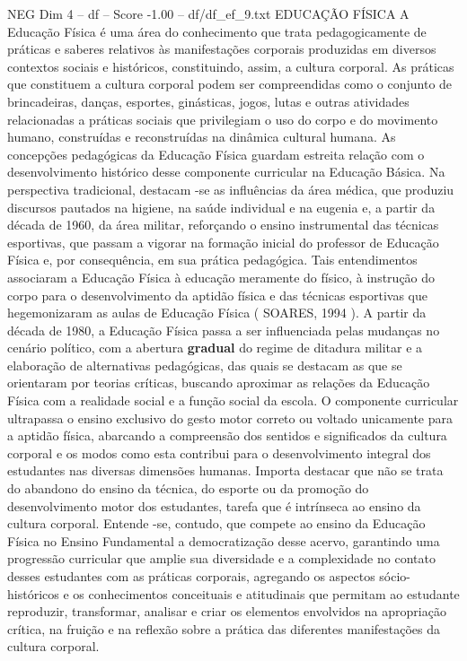 \begin{textsample}{NEG Dim 4 – df – Score -1.00 – df/df\_ef\_9.txt}  \label{ex:f4_neg_067}
EDUCAÇÃO FÍSICA A Educação Física é uma área do conhecimento que trata pedagogicamente de práticas e saberes relativos às manifestações corporais produzidas em diversos contextos sociais e históricos, constituindo, assim, a cultura corporal.
As práticas que constituem a cultura corporal podem ser compreendidas como o conjunto de brincadeiras, danças, esportes, ginásticas, jogos, lutas e outras atividades relacionadas a práticas sociais que privilegiam o uso do corpo e do movimento humano, construídas e reconstruídas na dinâmica cultural humana.
As concepções pedagógicas da Educação Física guardam estreita relação com o desenvolvimento histórico desse componente curricular na Educação Básica.
Na perspectiva tradicional, destacam -se as influências da área médica, que produziu discursos pautados na higiene, na saúde individual e na eugenia e, a partir da década de 1960, da área militar, reforçando o ensino instrumental das técnicas esportivas, que passam a vigorar na formação inicial do professor de Educação Física e, por consequência, em sua prática pedagógica.
Tais entendimentos associaram a Educação Física à educação meramente do físico, à instrução do corpo para o desenvolvimento da aptidão física e das técnicas esportivas que hegemonizaram as aulas de Educação Física ( SOARES, 1994 ).
A partir da década de 1980, a Educação Física passa a ser influenciada pelas mudanças no cenário político, com a abertura \textbf{gradual} do regime de ditadura militar e a elaboração de alternativas pedagógicas, das quais se destacam as que se orientaram por teorias críticas, buscando aproximar as relações da Educação Física com a realidade social e a função social da escola.
O componente curricular ultrapassa o ensino exclusivo do gesto motor correto ou voltado unicamente para a aptidão física, abarcando a compreensão dos sentidos e significados da cultura corporal e os modos como esta contribui para o desenvolvimento integral dos estudantes nas diversas dimensões humanas.
Importa destacar que não se trata do abandono do ensino da técnica, do esporte ou da promoção do desenvolvimento motor dos estudantes, tarefa que é intrínseca ao ensino da cultura corporal.
Entende -se, contudo, que compete ao ensino da Educação Física no Ensino Fundamental a democratização desse acervo, garantindo uma progressão curricular que amplie sua diversidade e a complexidade no contato desses estudantes com as práticas corporais, agregando os aspectos sócio-históricos e os conhecimentos conceituais e atitudinais que permitam ao estudante reproduzir, transformar, analisar e criar os elementos envolvidos na apropriação crítica, na fruição e na reflexão sobre a prática das diferentes manifestações da cultura corporal.

\end{textsample}
